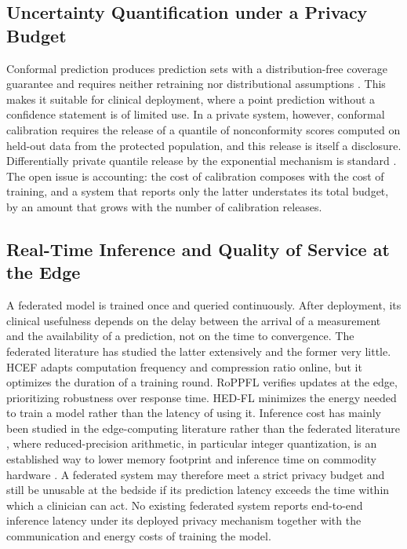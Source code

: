 \subsection{Uncertainty Quantification under a Privacy Budget}

Conformal prediction produces prediction sets with a distribution-free
coverage guarantee and requires neither retraining nor distributional
assumptions \cite{ref22, ref23}. This makes it suitable for clinical
deployment, where a point prediction without a confidence statement is of
limited use. In a private system, however, conformal calibration requires the
release of a quantile of nonconformity scores computed on held-out data from
the protected population, and this release is itself a disclosure.
Differentially private quantile release by the exponential mechanism is
standard \cite{ref24}. The open issue is accounting: the cost of calibration
composes with the cost of training, and a system that reports only the latter
understates its total budget, by an amount that grows with the number of
calibration releases.

\subsection{Real-Time Inference and Quality of Service at the Edge}

A federated model is trained once and queried continuously. After deployment,
its clinical usefulness depends on the delay between the arrival of a
measurement and the availability of a prediction, not on the time to
convergence. The federated literature has studied the latter extensively and
the former very little. HCEF \cite{ref4} adapts computation frequency and
compression ratio online, but it optimizes the duration of a training round.
RoPPFL \cite{ref10} verifies updates at the edge, prioritizing robustness over
response time. HED-FL \cite{ref3} minimizes the energy needed to train a model
rather than the latency of using it. Inference cost has mainly been studied in
the edge-computing literature rather than the federated literature
\cite{ref25}, where reduced-precision arithmetic, in particular integer
quantization, is an established way to lower memory footprint and inference
time on commodity hardware \cite{ref26}. A federated system may therefore meet
a strict privacy budget and still be unusable at the bedside if its prediction
latency exceeds the time within which a clinician can act. No existing
federated system reports end-to-end inference latency under its deployed
privacy mechanism together with the communication and energy costs of training
the model.

